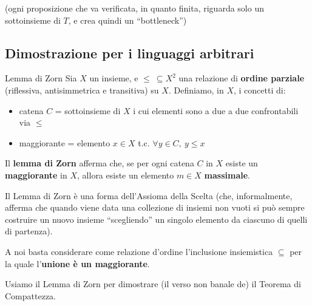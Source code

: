 \documentclass[a4paper,11pt]{report}
\begin{document}
{\small \color{gray}(ogni proposizione che va verificata, in quanto finita, riguarda solo un sottoinsieme di \(T  \), e crea quindi un ``bottleneck'')}

\subsection{Dimostrazione per i linguaggi arbitrari}

\begin{lemmabox}{Lemma di Zorn}{}
    Sia \( X \) un insieme, e \( \leq \ \subseteq X^2 \) una relazione di \textbf{ordine parziale} (riflessiva, antisimmetrica e transitiva) su \( X \). 
    Definiamo, in \( X \), i concetti di:
    \begin{itemize}
        \item catena \( C \) = sottoinsieme di \( X \) i cui elementi sono a due a due confrontabili via \( \leq  \)
        \item maggiorante = elemento \( x \in X \) t.c. \( \forall y \in C, \ y\leq x \)
    \end{itemize}
    Il \textbf{lemma di Zorn} afferma che, se per ogni catena \( C \) in \( X \) esiste un \textbf{maggiorante} in \( X \), allora esiste un elemento \( m \in X \) \textbf{massimale}.
\end{lemmabox}

Il Lemma di Zorn è una forma dell'Assioma della Scelta (che, informalmente, afferma che quando viene data una collezione di insiemi non vuoti si può sempre costruire un nuovo insieme ``scegliendo'' un singolo elemento da ciascuno di quelli di partenza).

A noi basta considerare come relazione d'ordine l'inclusione insiemistica \( \subseteq \) per la quale l'\textbf{unione è un maggiorante}.

Usiamo il Lemma di Zorn per dimostrare (il verso non banale de) il Teorema di Compattezza.
\end{document}
